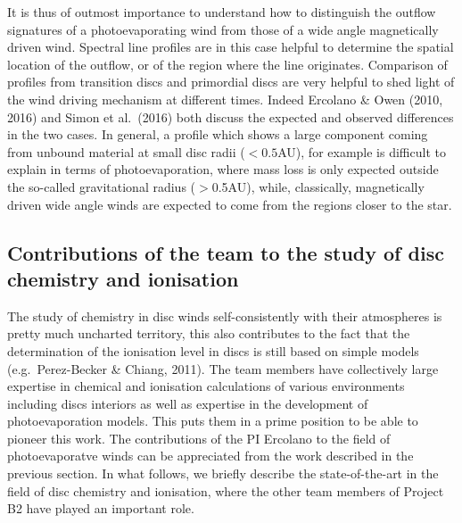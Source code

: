 \documentclass[10pt,fleqn,twoside]{article}
\begin{document}
It is thus of outmost importance to understand how to distinguish the
outflow signatures of a photoevaporating wind from those of a wide
angle magnetically driven wind. Spectral line profiles are in this
case helpful to determine the spatial location of the outflow, or of
the region where the line originates. Comparison of profiles from
transition discs and primordial discs are very helpful to shed light
of the wind driving mechanism at different times. Indeed Ercolano \&
Owen (2010, 2016) and Simon et al.\ (2016) both discuss the expected
and observed differences in the two cases. In general, a profile which
shows a large component coming from unbound material at small disc
radii ($<0.5$AU), for example is difficult to explain in terms of
photoevaporation, where mass loss is only expected outside the
so-called gravitational radius ($>$0.5AU), while, classically,
magnetically driven wide angle winds are expected to come from the
regions closer to the star. 


\subsection{Contributions of the team to the study of disc chemistry and ionisation}
The study of chemistry in disc winds self-consistently with their
atmospheres is pretty much uncharted territory, this also contributes
to the fact that the determination of the ionisation level in discs is
still based on simple models (e.g.\ Perez-Becker \& Chiang, 2011). The
team members have collectively large expertise in chemical and ionisation
calculations of various environments including discs interiors as well
as expertise in the development of photoevaporation models. This puts
them in a prime position to be able to pioneer this work. The
contributions of the PI Ercolano to the field of photoevaporatve winds
can be appreciated from the work described in the previous section. In what
follows, we briefly describe the state-of-the-art in the field of disc
chemistry and ionisation, where the other team members of Project B2 have played
an important role.  
\end{document}
